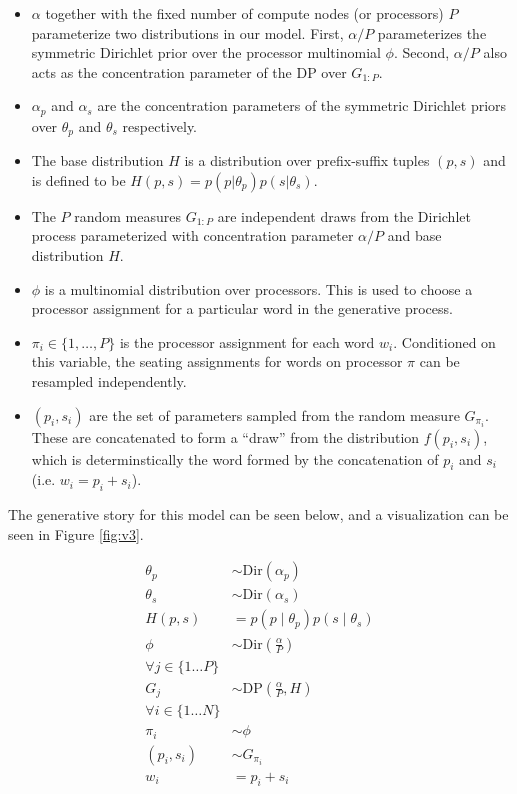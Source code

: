 \begin{itemize}

\item $\alpha$ together with the fixed number of compute nodes (or
  processors) $P$ parameterize two distributions in our model. First,
  $\alpha/P$ parameterizes the symmetric Dirichlet prior over the
  processor multinomial $\phi$. Second, $\alpha/P$ also acts as the
  concentration parameter of the DP over $G_{1:P}$.

\item $\alpha_p$ and $\alpha_s$ are the concentration parameters of
  the symmetric Dirichlet priors over $\theta_p$ and $\theta_s$
  respectively.

\item The base distribution $H$ is a distribution over prefix-suffix
  tuples $(p, s)$ and is defined to be $H(p, s) = p(p | \theta_p) p(s
  | \theta_s)$.

\item The $P$ random measures $G_{1:P}$ are independent draws from the
  Dirichlet process parameterized with concentration parameter
  $\alpha/P$ and base distribution $H$.

\item $\phi$ is a multinomial distribution over processors. This is
  used to choose a processor assignment for a particular word in the
  generative process.

\item $\pi_i \in \{1, \ldots, P\}$ is the processor assignment for
  each word $w_i$. Conditioned on this variable, the seating
  assignments for words on processor $\pi$ can be resampled
  independently.

\item $(p_i, s_i)$ are the set of parameters sampled from the random
  measure $G_{\pi_i}$. These are concatenated to form a ``draw'' from
  the distribution $f(p_i, s_i)$, which is determinstically the word
  formed by the concatenation of $p_i$ and $s_i$ (i.e. $w_i = p_i +
  s_i$).

\end{itemize}

The generative story for this model can be seen below, and a
visualization can be seen in Figure \ref{fig:v3}.

\begin{align*}
  \theta_p & \sim \text{Dir}(\alpha_p) \\
  \theta_s & \sim \text{Dir}(\alpha_s) \\
  H(p, s) & = p(p \mid \theta_p) p(s \mid \theta_s) \\
  \phi & \sim \text{Dir}\left(\frac{\alpha}{P}\right) \\
  \forall j \in \{1 \dots P\} \\
  G_j & \sim \text{DP}\left(\frac{\alpha}{P}, H\right)\\
  \forall i \in \{1 \dots N\} \\
  \pi_i & \sim \phi \\
  (p_i, s_i) & \sim G_{\pi_i} \\
  w_i & = p_i+s_i
\end{align*}

